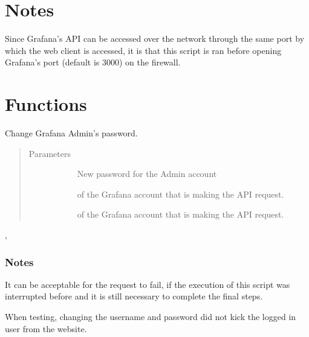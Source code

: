 \documentclass[letterpaper,10pt,english]{sphinxmanual}
\begin{document}
\section{Notes}
\label{\detokenize{setup:notes}}
Since Grafana’s API can be accessed over the network through the same port by
which the web client is accessed, it is  that this script is ran
before opening Grafana’s port (default is 3000) on the firewall.


\section{Functions}
\label{\detokenize{setup:functions}}

\begin{fulllineitems}
\label{\detokenize{setup:gpSetup.changeAdminPassword}}
Change Grafana Admin’s password.
\begin{quote}\begin{description}
\item[{Parameters}] \leavevmode\begin{description}
\item[{}] \leavevmode{[}\sphinxtitleref{str}{]}
New password for the Admin account

\item[{}] \leavevmode{[}\sphinxtitleref{str}{]}
 of the Grafana account that is making the API request.

\item[{}] \leavevmode{[}\sphinxtitleref{str}{]}
 of the Grafana account that is making the API request.

\end{description}

\end{description}\end{quote}




{\hyperref[\detokenize{grafanaAPI:module-grafanaAPI}]{}}, {\hyperref[\detokenize{setup:gpSetup.renameAdminUser}]{}}


\subsubsection*{Notes}

It can be acceptable for the request to fail, if the execution of this script
was interrupted before and it is still necessary to complete the final steps.

When testing, changing the username and password did not kick the logged in 
user from the website.

\end{fulllineitems}
\end{document}
